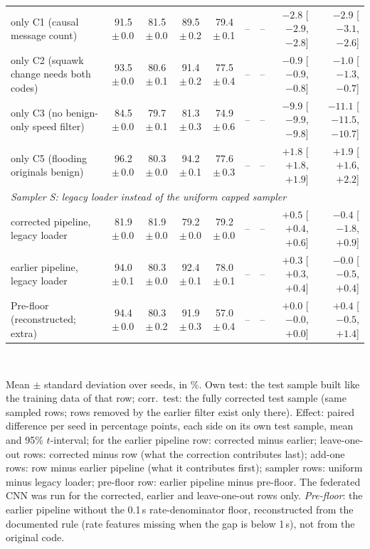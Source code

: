 \begin{table}[t]
\begin{tabular}{lrrrrrrrr}
\quad only C1 (causal message count) & 91.5{\,}$\pm${\,}0.0 & 81.5{\,}$\pm${\,}0.0 & 89.5{\,}$\pm${\,}0.2 & 79.4{\,}$\pm${\,}0.1 & -- & -- & $-2.8$ [$-2.9$, $-2.8$] & $-2.9$ [$-3.1$, $-2.6$] \\
\quad only C2 (squawk change needs both codes) & 93.5{\,}$\pm${\,}0.0 & 80.6{\,}$\pm${\,}0.1 & 91.4{\,}$\pm${\,}0.2 & 77.5{\,}$\pm${\,}0.4 & -- & -- & $-0.9$ [$-0.9$, $-0.8$] & $-1.0$ [$-1.3$, $-0.7$] \\
\quad only C3 (no benign-only speed filter) & 84.5{\,}$\pm${\,}0.0 & 79.7{\,}$\pm${\,}0.1 & 81.3{\,}$\pm${\,}0.3 & 74.9{\,}$\pm${\,}0.6 & -- & -- & $-9.9$ [$-9.9$, $-9.8$] & $-11.1$ [$-11.5$, $-10.7$] \\
\quad only C5 (flooding originals benign) & 96.2{\,}$\pm${\,}0.0 & 80.3{\,}$\pm${\,}0.0 & 94.2{\,}$\pm${\,}0.1 & 77.6{\,}$\pm${\,}0.3 & -- & -- & $+1.8$ [$+1.8$, $+1.9$] & $+1.9$ [$+1.6$, $+2.2$] \\
\midrule
\multicolumn{9}{l}{\emph{Sampler S: legacy loader instead of the uniform capped sampler}} \\
\quad corrected pipeline, legacy loader & 81.9{\,}$\pm${\,}0.0 & 81.9{\,}$\pm${\,}0.0 & 79.2{\,}$\pm${\,}0.0 & 79.2{\,}$\pm${\,}0.0 & -- & -- & $+0.5$ [$+0.4$, $+0.6$] & $-0.4$ [$-1.8$, $+0.9$] \\
\quad earlier pipeline, legacy loader & 94.0{\,}$\pm${\,}0.1 & 80.3{\,}$\pm${\,}0.0 & 92.4{\,}$\pm${\,}0.1 & 78.0{\,}$\pm${\,}0.1 & -- & -- & $+0.3$ [$+0.3$, $+0.4$] & $-0.0$ [$-0.5$, $+0.4$] \\
\midrule
Pre-floor (reconstructed; extra) & 94.4{\,}$\pm${\,}0.0 & 80.3{\,}$\pm${\,}0.2 & 91.9{\,}$\pm${\,}0.3 & 57.0{\,}$\pm${\,}0.4 & -- & -- & $+0.0$ [$-0.0$, $+0.0$] & $+0.4$ [$-0.5$, $+1.4$] \\
\bottomrule
\end{tabular}
\\[2pt]
\parbox{\linewidth}{\scriptsize Mean $\pm$ standard deviation over seeds, in \%. Own test: the test sample built like the training data of that row; corr.\ test: the fully corrected test sample (same sampled rows; rows removed by the earlier filter exist only there). Effect: paired difference per seed in percentage points, each side on its own test sample, mean and 95\% $t$-interval; for the earlier pipeline row: corrected minus earlier; leave-one-out rows: corrected minus row (what the correction contributes last); add-one rows: row minus earlier pipeline (what it contributes first); sampler rows: uniform minus legacy loader; pre-floor row: earlier pipeline minus pre-floor. The federated CNN was run for the corrected, earlier and leave-one-out rows only. \emph{Pre-floor}: the earlier pipeline without the 0.1\,s rate-denominator floor, reconstructed from the documented rule (rate features missing when the gap is below 1\,s), not from the original code.}
\end{table}
